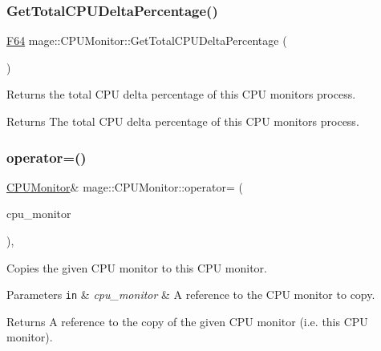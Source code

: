 \subsubsection{\texorpdfstring{Get\+Total\+C\+P\+U\+Delta\+Percentage()}{GetTotalCPUDeltaPercentage()}}
{\footnotesize\ttfamily \mbox{\hyperlink{namespacemage_ad26233bbec640deda836e572c1a23708}{F64}} mage\+::\+C\+P\+U\+Monitor\+::\+Get\+Total\+C\+P\+U\+Delta\+Percentage (\begin{DoxyParamCaption}{ }\end{DoxyParamCaption})\hspace{0.3cm}{\ttfamily [noexcept]}}

Returns the total C\+PU delta percentage of this C\+PU monitor\textquotesingle{}s process.

\begin{DoxyReturn}{Returns}
The total C\+PU delta percentage of this C\+PU monitor\textquotesingle{}s process. 
\end{DoxyReturn}
\mbox{\label{classmage_1_1_c_p_u_monitor_a878cc9fd170e6c34ee28f06591b06eeb}} 
\subsubsection{\texorpdfstring{operator=()}{operator=()}\hspace{0.1cm}{\footnotesize\ttfamily [1/2]}}
{\footnotesize\ttfamily \mbox{\hyperlink{classmage_1_1_c_p_u_monitor}{C\+P\+U\+Monitor}}\& mage\+::\+C\+P\+U\+Monitor\+::operator= (\begin{DoxyParamCaption}\item[{const \mbox{\hyperlink{classmage_1_1_c_p_u_monitor}{C\+P\+U\+Monitor}} \&}]{cpu\+\_\+monitor }\end{DoxyParamCaption})\hspace{0.3cm}{\ttfamily [default]}, {\ttfamily [noexcept]}}

Copies the given C\+PU monitor to this C\+PU monitor.


\begin{DoxyParams}[1]{Parameters}
\mbox{\tt in}  & {\em cpu\+\_\+monitor} & A reference to the C\+PU monitor to copy. \\
\hline
\end{DoxyParams}
\begin{DoxyReturn}{Returns}
A reference to the copy of the given C\+PU monitor (i.\+e. this C\+PU monitor). 
\end{DoxyReturn}
\mbox{\label{classmage_1_1_c_p_u_monitor_af1eacba414b2db72cf13d335f78785cd}} 
